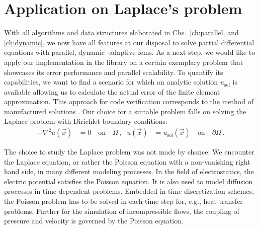 \chapter{Application on Laplace's problem}
\label{ch:results}
\glsresetall


With all algorithms and data structures elaborated in Chs.~\ref{ch:parallel} and \ref{ch:dynamic}, we now have all features at our disposal to solve partial differential equations with parallel, dynamic \hp-adaptive \glspl{fem}. As a next step, we would like to apply our implementation in the \dealii{} library on a certain exemplary problem that showcases its error performance and parallel scalability. To quantify its capabilities, we want to find a scenario for which an analytic solution $u_\text{sol}$ is available allowing us to calculate the actual error of the finite element approximation. This approach for code verification corresponds to the method of manufactured solutions \parencite{salari2000}. Our choice for a suitable problem falls on solving the Laplace problem with Dirichlet boundary conditions:
\begin{align}
- \nabla^2 u(\vec{x}) &= 0 \quad\text{on}\quad \Omega \,\text{,} & u(\vec{x}) &= u_\text{sol}(\vec{x}) \quad\text{on}\quad \partial\Omega \,\text{.}
\end{align}

The choice to study the Laplace problem was not made by chance: We encounter the Laplace equation, or rather the Poisson equation with a non-vanishing right hand side, in many different modeling processes. In the field of electrostatics, the electric potential satisfies the Poisson equation. It is also used to model diffusion processes in time-dependent problems. Embedded in time discretization schemes, the Poisson problem has to be solved in each time step for, e.g., heat transfer problems. Further for the simulation of incompressible flows, the coupling of pressure and velocity is governed by the Poisson equation.

